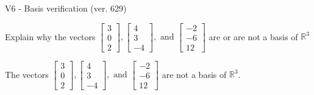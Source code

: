 \begin{exercise}
  \begin{exerciseTitle}V6 - Basis verification (ver. 629)\end{exerciseTitle}
  \begin{exerciseStatement}
    Explain why the vectors \(\left[\begin{array}{r}
3 \\
0 \\
2
\end{array}\right] , \left[\begin{array}{r}
4 \\
3 \\
-4
\end{array}\right] , \text{ and } \left[\begin{array}{r}
-2 \\
-6 \\
12
\end{array}\right]\) are or are not a basis of \(\mathbb{R}^3\)	


  \end{exerciseStatement}
  \begin{exerciseAnswer}
   The vectors \(\left[\begin{array}{r}
3 \\
0 \\
2
\end{array}\right] , \left[\begin{array}{r}
4 \\
3 \\
-4
\end{array}\right] , \text{ and } \left[\begin{array}{r}
-2 \\
-6 \\
12
\end{array}\right]\) 
  	 are not  a basis of \(\mathbb{R}^3\).
  


  \end{exerciseAnswer}
\end{exercise}